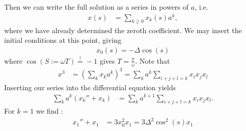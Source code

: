 \documentclass[english, parskip=full]{scrartcl}
\newcommand{\kla}{}
\begin{document}
Then we can write the full solution as a series in powers of $a$, i.e.
\begin{align}
x(s) &= \sum_{k\ge 0} x_k(s)a^k, 
\end{align}
where we have already determined the zeroth coefficient.
We may insert the initial conditions at this point, giving
\begin{align}
x_0(s) = -\Delta \cos (s)
\end{align}
where $\cos(S := \omega T) \overset{!}{=} -1$ gives $T = \frac{\pi}{\omega}$.
Note that
\begin{align}
x^3 &= \kla\left( \sum_k x_ka^k \right)^3 = \sum_ka^k\sum_{i+j+l=k} x_ix_jx_l
\end{align}
Inserting our series into the differential equation yields
\begin{align}
\sum_ka^k\kla\left( x_k''+x_k \right) &= \sum_ka^{k+1}\sum_{i+j+l=k} x_ix_jx_l.
\end{align}
For $k=1$ we find :
\begin{align}
x_1''+x_1 &= 3x_0^2x_1 = 3\Delta^2\cos^2(s)x_1
\end{align}

\end{document}
